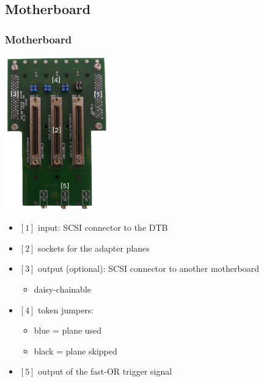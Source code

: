 \documentclass[9pt]{beamer}
\begin{document}
\subsection{Motherboard}
\begin{frame}
	\frametitle{Motherboard}
	\begin{center}
		\begin{minipage}{4.6cm}
			\centering
			\includegraphics[width=4.5cm]{Pics/Motherboard}
		\end{minipage}
		\hspace*{2pt}
		\begin{minipage}{6cm}
			\begin{itemize}
				\item $[1]$ input: SCSI connector to the DTB
				\item $[2]$ sockets for the adapter planes
				\item $[3]$ output (optional): SCSI connector to another motherboard
				\begin{itemize}
					\item daisy-chainable
				\end{itemize}
				\item $[4]$ token jumpers:
				\begin{itemize}
					\item blue\hspace{4pt} = plane used
					\item black = plane skipped
				\end{itemize}
				\item $[5]$ output of the fast-OR trigger signal 
			\end{itemize}
		\end{minipage}\no\s
	\end{center}
\end{frame}
\end{document}
